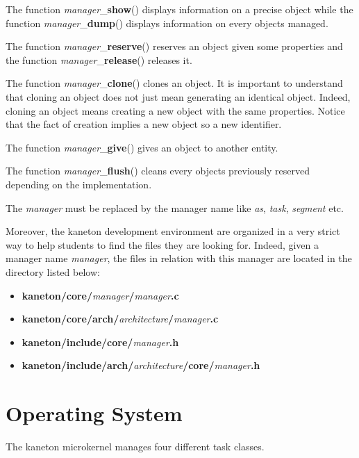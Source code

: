 The function \textit{manager}\_\textbf{show}() displays information
on a precise object while the function \textit{manager}\_\textbf{dump}()
displays information on every objects managed.

The function \textit{manager}\_\textbf{reserve}() reserves an object
given some properties and the function \textit{manager}\_\textbf{release}()
releases it.

The function \textit{manager}\_\textbf{clone}() clones an object. It is
important to understand that cloning an object does not just mean
generating an identical object. Indeed, cloning an object means creating
a new object with the same properties. Notice that the fact of creation
implies a new object so a new identifier.

The function \textit{manager}\_\textbf{give}() gives an object to another
entity.

The function \textit{manager}\_\textbf{flush}() cleans every objects
previously reserved depending on the implementation.

The \textit{manager} must be replaced by the manager name like \textit{as},
\textit{task}, \textit{segment} etc.

Moreover, the kaneton development environment are organized in a very
strict way to help students to find the files they are looking for. Indeed,
given a manager name \textit{manager}, the files in relation with this
manager are located in the directory listed below:

\begin{itemize}
  \item
    \textbf{kaneton/core/}\textit{manager}\textbf{/}\textit{manager}\textbf{.c}
  \item
    \textbf{kaneton/core/arch/}\textit{architecture}\textbf{/}\textit{manager}\textbf{.c}
  \item
    \textbf{kaneton/include/core/}\textit{manager}\textbf{.h}
  \item
    \textbf{kaneton/include/arch/}\textit{architecture}\textbf{/core/}\textit{manager}\textbf{.h}
\end{itemize}

%
%

\section{Operating System}

The kaneton microkernel manages four different task classes.

